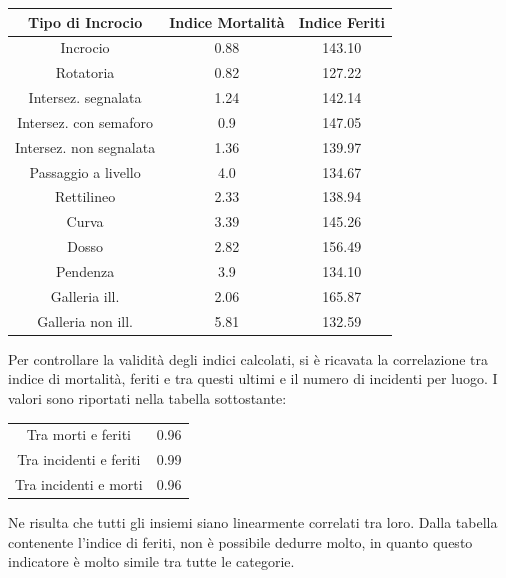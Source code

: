 \documentclass[a4paper]{report}
\begin{document}
\begin{center}
    \def\arraystretch{1.5}%
    \begin{tabular}{ |c|c|c| } 
    \hline
    Tipo di Incrocio & Indice Mortalità & Indice Feriti \\ 
    \hline
    \rowcolor{TableGray}
    Incrocio                & 0.88 & 143.10 \\
    Rotatoria               & 0.82 & 127.22 \\
    \rowcolor{TableGray}
    Intersez. segnalata     & 1.24 & 142.14 \\
    Intersez. con semaforo  & 0.9 & 147.05 \\
    \rowcolor{TableGray}
    Intersez. non segnalata & 1.36 & 139.97\\
    Passaggio a livello     & 4.0 & 134.67\\
    \rowcolor{TableGray}
    Rettilineo              & 2.33 & 138.94\\
    Curva                   & 3.39 & 145.26\\
    \rowcolor{TableGray}
    Dosso                   & 2.82 & 156.49\\
    Pendenza                & 3.9 & 134.10\\
    \rowcolor{TableGray}
    Galleria ill.           & 2.06 & 165.87\\
    Galleria non ill.       & 5.81 & 132.59\\
    \hline
    \end{tabular}
\end{center}

Per controllare la validità degli indici calcolati, si è ricavata la correlazione 
tra indice di mortalità, feriti e tra questi ultimi e il numero di incidenti per 
luogo.
I valori sono riportati nella tabella sottostante: 

\begin{center}
    \def\arraystretch{1.5}%
    \begin{tabular}{ |c|c| }
        \hline
        \rowcolor{TableGray}
        Tra morti e feriti      & 0.96 \\ 
        Tra incidenti e feriti  & 0.99 \\
        \rowcolor{TableGray}
        Tra incidenti e morti   & 0.96 \\
        \hline
    \end{tabular}
\end{center}

Ne risulta che tutti gli insiemi siano linearmente correlati tra loro. 
Dalla tabella contenente l'indice di feriti, non è possibile dedurre molto, 
in quanto questo indicatore è molto simile tra tutte le categorie.
\end{document}
